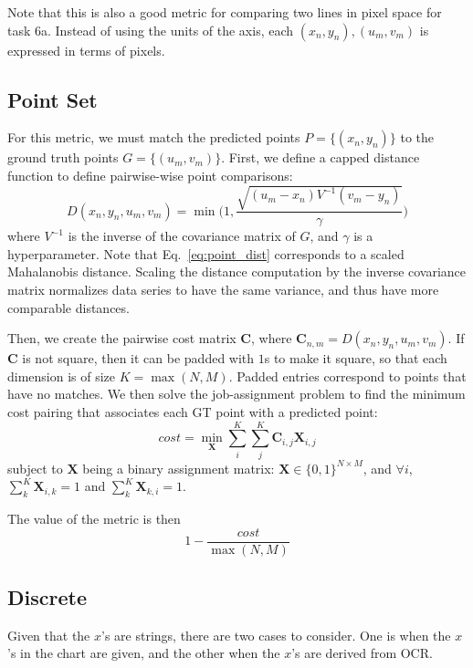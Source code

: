 \documentclass[a4paper,11pt]{scrartcl}
\begin{document}
Note that this is also a good metric for comparing two lines in pixel space for task 6a.
Instead of using the units of the axis, each $(x_n, y_n), (u_m, v_m)$ is expressed in terms of pixels.

\subsection{Point Set}

For this metric, we must match the predicted points $P = \{(x_n,y_n)\}$ to the ground truth points $G = \{(u_m, v_m)\}$.
First, we define a capped distance function to define pairwise-wise point comparisons:
\begin{equation} \label{eq:point_dist}
D(x_n, y_n, u_m, v_m) = \min \Big(1, \frac{\sqrt{(u_m - x_n)V^{-1}(v_m - y_n)}}{\gamma} \Big)
\end{equation}
where $V^{-1}$ is the inverse of the covariance matrix of $G$, and $\gamma$ is a hyperparameter.
Note that Eq.~\ref{eq:point_dist} corresponds to a scaled Mahalanobis distance.
Scaling the distance computation by the inverse covariance matrix normalizes data series to have the same variance, and thus have more comparable distances.

Then, we create the pairwise cost matrix $\mathbf{C}$, where $\mathbf{C}_{n,m} = D(x_n, y_n, u_m, v_m)$.
If $\mathbf{C}$ is not square, then it can be padded with $1$s to make it square, so that each dimension is of size $K = \max(N,M)$.
Padded entries correspond to points that have no matches.
We then solve the job-assignment problem to find the minimum cost pairing that associates each GT point with a predicted point:
\begin{equation} \label{eq:assign}
cost = \min_{\mathbf{X}} \sum_i^K \sum_j^K \mathbf{C}_{i,j} \mathbf{X}_{i,j}
\end{equation}
subject to $\mathbf{X}$ being a binary assignment matrix: $\mathbf{X} \in \{0,1\}^{N \times M}$, and $\forall i$, $\sum_k^K \mathbf{X}_{i,k} = 1$ and $\sum_k^K \mathbf{X}_{k,i} = 1$.

The value of the metric is then 
\begin{equation} \label{eq:assign_cost}
1 - \frac{cost}{\max(N,M)}
\end{equation}


\subsection{Discrete}

Given that the $x$'s are strings, there are two cases to consider.
One is when the $x$'s in the chart are given, and the other when the $x$'s are derived from OCR.
\end{document}
